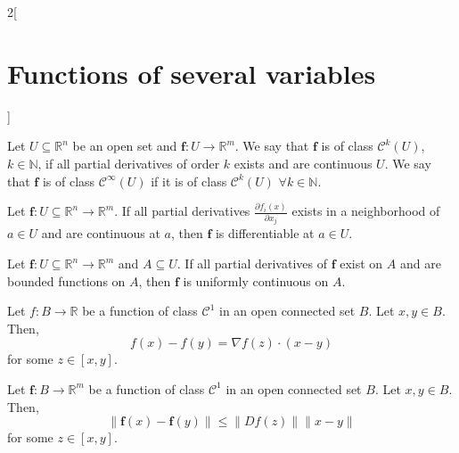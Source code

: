 \documentclass[class=article,10pt,crop=false]{standalone}
\begin{document}
\begin{multicols}{2}[\section{Functions of several variables}]
\begin{definition}
Let $U\subseteq\mathbb{R}^n$ be an open set and $\boldsymbol{f}:U\rightarrow\mathbb{R}^m$. We say that $\boldsymbol{f}$ is of class $\mathcal{C}^k(U)$, $k\in\mathbb{N}$, if all partial derivatives of order $k$ exists and are continuous $U$. We say that $\boldsymbol{f}$ is of class $\mathcal{C}^\infty(U)$ if it is of class $\mathcal{C}^k(U)$ $\forall k\in\mathbb{N}$.
\end{definition}
\begin{theorem}
Let $\boldsymbol{f}:U\subseteq\mathbb{R}^n\rightarrow\mathbb{R}^m$. If all partial derivatives $\displaystyle \frac{\partial f_i(x)}{\partial x_j}$ exists in a  neighborhood of $a\in U$ and are continuous at $a$, then $\boldsymbol{f}$ is differentiable at $a\in U$.
\end{theorem}
\begin{prop}
Let $\boldsymbol{f}:U\subseteq\mathbb{R}^n\rightarrow\mathbb{R}^m$ and $A\subseteq U$. If all partial derivatives of $\boldsymbol{f}$ exist on $A$ and are bounded functions on $A$, then $\boldsymbol{f}$ is uniformly continuous on $A$.
\end{prop}
\begin{theorem}
Let $f:B\rightarrow\mathbb{R}$ be a function of class $\mathcal{C}^1$ in an open connected set $B$. Let $x,y\in B$. Then, $$f(x)-f(y)=\nabla f(z)\cdot(x-y)$$ for some $z\in[x,y]$.
\end{theorem}
\begin{theorem}
Let $\boldsymbol{f}:B\rightarrow\mathbb{R}^m$ be a function of class $\mathcal{C}^1$ in an open connected set $B$. Let $x,y\in B$. Then, $$\|\boldsymbol{f}(x)-\boldsymbol{f}(y)\|\leq\|Df(z)\|\|x-y\|$$ for some $z\in[x,y]$.
\end{theorem}

\end{multicols}
\end{document}
